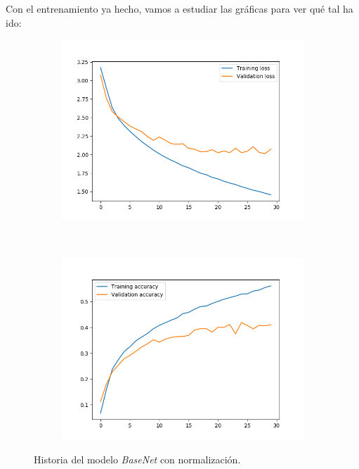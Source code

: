 \documentclass[11pt,a4paper]{article}
\begin{document}
Con el entrenamiento ya hecho, vamos a estudiar las gráficas para ver qué tal ha ido:

\begin{figure}[H]
  \centering
  \begin{subfigure}{.5\textwidth}
    \centering
    \includegraphics[scale=0.4]{img/norm-loss.png}
    \label{fig:norm-loss}
  \end{subfigure}%
  ~ \quad
  \begin{subfigure}{.5\textwidth}
    \centering
  	\includegraphics[scale=0.4]{img/norm-acc.png}
  	\label{fig:norm-acc}
  \end{subfigure}
  \caption{Historia del modelo \textit{BaseNet} con normalización.}
  \label{fig:norm-history}
\end{figure}
\end{document}
